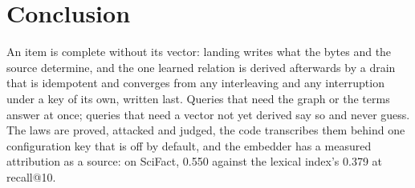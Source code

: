 \documentclass[11pt]{article}
\theoremstyle{plain}
\theoremstyle{definition}
\theoremstyle{remark}
\newcommand{\shapE}{0.550}
\newcommand{\shapL}{0.379}
\begin{document}
\section{Conclusion}

An item is complete without its vector: landing writes what the bytes and the source determine,
and the one learned relation is derived afterwards by a drain that is idempotent and converges
from any interleaving and any interruption under a key of its own, written last. Queries that need
the graph or the terms answer at once; queries that need a vector not yet derived say so and never
guess. The laws are proved, attacked and judged, the code transcribes them behind one configuration
key that is off by default, and the embedder has a measured attribution as a source: on SciFact,
\shapE{} against the lexical index's \shapL{} at recall@10.



\end{document}
